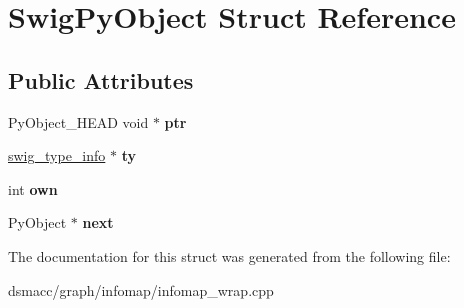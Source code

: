 \hypertarget{structSwigPyObject}{}\section{Swig\+Py\+Object Struct Reference}
\label{structSwigPyObject}
\subsection*{Public Attributes}
\begin{DoxyCompactItemize}
\item 
\mbox{\label{structSwigPyObject_a41b1d569a8ba4fa9b1d87579c144891b}} 
Py\+Object\+\_\+\+H\+E\+AD void $\ast$ {\bfseries ptr}
\item 
\mbox{\label{structSwigPyObject_a510b5a6f66a8a33c0a54c3eeb83e5ba5}} 
\mbox{\hyperlink{structswig__type__info}{swig\+\_\+type\+\_\+info}} $\ast$ {\bfseries ty}
\item 
\mbox{\label{structSwigPyObject_a83cb6489fb1b171467f06c091ae6f283}} 
int {\bfseries own}
\item 
\mbox{\label{structSwigPyObject_af7b93d7ae49a6f3bdf6511043fe8e839}} 
Py\+Object $\ast$ {\bfseries next}
\end{DoxyCompactItemize}


The documentation for this struct was generated from the following file\+:\begin{DoxyCompactItemize}
\item 
dsmacc/graph/infomap/infomap\+\_\+wrap.\+cpp\end{DoxyCompactItemize}
